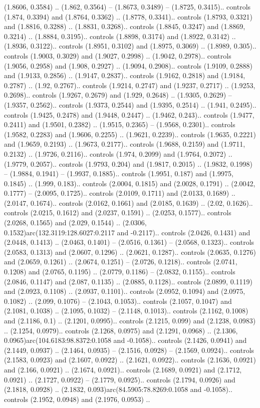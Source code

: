 (1.8606, 0.3584) .. (1.862, 0.3564) -- (1.8673, 0.3489) -- (1.8725, 0.3415).. controls (1.874, 0.3394) and (1.8764, 0.3362) .. (1.8778, 0.3341).. controls (1.8793, 0.3321) and (1.8816, 0.3288) .. (1.8831, 0.3268).. controls (1.8845, 0.3247) and (1.8869, 0.3214) .. (1.8884, 0.3195).. controls (1.8898, 0.3174) and (1.8922, 0.3142) .. (1.8936, 0.3122).. controls (1.8951, 0.3102) and (1.8975, 0.3069) .. (1.8989, 0.305).. controls (1.9003, 0.3029) and (1.9027, 0.2998) .. (1.9042, 0.2978).. controls (1.9056, 0.2958) and (1.908, 0.2927) .. (1.9094, 0.2908).. controls (1.9109, 0.2888) and (1.9133, 0.2856) .. (1.9147, 0.2837).. controls (1.9162, 0.2818) and (1.9184, 0.2787) .. (1.92, 0.2767).. controls (1.9214, 0.2747) and (1.9237, 0.2717) .. (1.9253, 0.2698).. controls (1.9267, 0.2679) and (1.929, 0.2648) .. (1.9305, 0.2629) -- (1.9357, 0.2562).. controls (1.9373, 0.2544) and (1.9395, 0.2514) .. (1.941, 0.2495).. controls (1.9425, 0.2478) and (1.9448, 0.2447) .. (1.9462, 0.243).. controls (1.9477, 0.2411) and (1.9501, 0.2382) .. (1.9515, 0.2365) -- (1.9568, 0.2301).. controls (1.9582, 0.2283) and (1.9606, 0.2255) .. (1.9621, 0.2239).. controls (1.9635, 0.2221) and (1.9659, 0.2193) .. (1.9673, 0.2177).. controls (1.9688, 0.2159) and (1.9711, 0.2132) .. (1.9726, 0.2116).. controls (1.974, 0.2099) and (1.9764, 0.2072) .. (1.9779, 0.2057).. controls (1.9793, 0.204) and (1.9817, 0.2015) .. (1.9832, 0.1998) -- (1.9884, 0.1941) -- (1.9937, 0.1885).. controls (1.9951, 0.187) and (1.9975, 0.1845) .. (1.999, 0.183).. controls (2.0004, 0.1815) and (2.0028, 0.1791) .. (2.0042, 0.1777) -- (2.0095, 0.1725).. controls (2.0109, 0.1711) and (2.0133, 0.1689) .. (2.0147, 0.1674).. controls (2.0162, 0.1661) and (2.0185, 0.1639) .. (2.02, 0.1626).. controls (2.0215, 0.1612) and (2.0237, 0.1591) .. (2.0253, 0.1577).. controls (2.0268, 0.1565) and (2.029, 0.1544) .. (2.0306, 0.1532)arc(132.3119:128.6027:0.2117 and -0.2117).. controls (2.0426, 0.1431) and (2.0448, 0.1413) .. (2.0463, 0.1401) -- (2.0516, 0.1361) -- (2.0568, 0.1323).. controls (2.0583, 0.1313) and (2.0607, 0.1296) .. (2.0621, 0.1287).. controls (2.0635, 0.1276) and (2.0659, 0.1261) .. (2.0674, 0.1251) -- (2.0726, 0.1218).. controls (2.0741, 0.1208) and (2.0765, 0.1195) .. (2.0779, 0.1186) -- (2.0832, 0.1155).. controls (2.0846, 0.1147) and (2.087, 0.1135) .. (2.0885, 0.1128).. controls (2.0899, 0.1119) and (2.0923, 0.1108) .. (2.0937, 0.1101).. controls (2.0952, 0.1094) and (2.0975, 0.1082) .. (2.099, 0.1076) -- (2.1043, 0.1053).. controls (2.1057, 0.1047) and (2.1081, 0.1038) .. (2.1095, 0.1032) -- (2.1148, 0.1013).. controls (2.1162, 0.1008) and (2.1186, 0.1) .. (2.1201, 0.0995).. controls (2.1215, 0.099) and (2.1238, 0.0983) .. (2.1254, 0.0979).. controls (2.1268, 0.0975) and (2.1291, 0.0968) .. (2.1306, 0.0965)arc(104.6183:98.8372:0.1058 and -0.1058).. controls (2.1426, 0.0941) and (2.1449, 0.0937) .. (2.1464, 0.0935) -- (2.1516, 0.0928) -- (2.1569, 0.0924).. controls (2.1583, 0.0923) and (2.1607, 0.0922) .. (2.1621, 0.0922).. controls (2.1636, 0.0921) and (2.166, 0.0921) .. (2.1674, 0.0921).. controls (2.1689, 0.0921) and (2.1712, 0.0921) .. (2.1727, 0.0922) -- (2.1779, 0.0925).. controls (2.1794, 0.0926) and (2.1818, 0.0928) .. (2.1832, 0.093)arc(84.5905:78.8269:0.1058 and -0.1058).. controls (2.1952, 0.0948) and (2.1976, 0.0953) .. 
